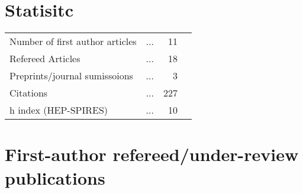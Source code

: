 \documentclass[10pt,floatfix,a4paper]{article}
\begin{document}
\section*{Statisitc}
\begin{tabular}{ l l r l}
	Number of first author articles 	& ... & 11 \\
	Refereed Articles 					& ... & 18 \\
	Preprints/journal sumissoions 		& ... & 3  \\
	Citations 							& ... & 227 \\
	h index (HEP-SPIRES) 				& ... & 10 \\
\end{tabular}

\section*{First-author refereed/under-review publications}
\end{document}
